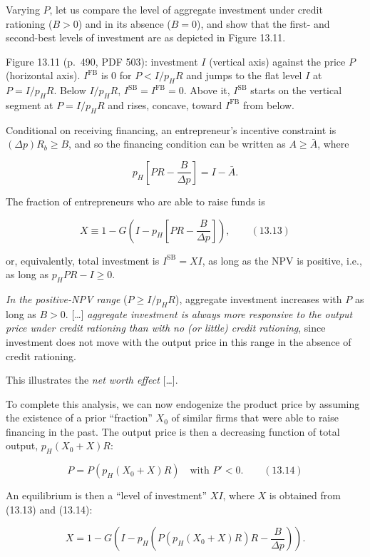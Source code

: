 \documentclass[11pt,a4paper]{article}
\begin{document}
Varying \(P\), let us compare the level of aggregate investment under credit rationing (\(B > 0\))
and in its absence (\(B = 0\)), and show that the first- and second-best levels of investment are as
depicted in Figure 13.11.

Figure 13.11 (p.~490, PDF 503): investment \(I\) (vertical axis) against the price \(P\) (horizontal
axis). \(I^{\text{FB}}\) is 0 for \(P < I/p_H R\) and jumps to the flat level \(I\) at
\(P = I/p_H R\). Below \(I/p_H R\), \(I^{\text{SB}} = I^{\text{FB}} = 0\). Above it,
\(I^{\text{SB}}\) starts on the vertical segment at \(P = I/p_H R\) and rises, concave, toward
\(I^{\text{FB}}\) from below.

Conditional on receiving financing, an entrepreneur's incentive constraint is
\((\Delta p)R_b \geqslant B\), and so the financing condition can be written as
\(A \geqslant \bar A\), where

\[p_H\left[PR - \frac{B}{\Delta p}\right] = I - \bar A.\]

The fraction of entrepreneurs who are able to raise funds is

\[X \equiv 1 - G\left(I - p_H\left[PR - \frac{B}{\Delta p}\right]\right), \qquad (13.13)\]

or, equivalently, total investment is \(I^{\text{SB}} = XI\), as long as the NPV is positive, i.e.,
as long as \(p_H PR - I \geqslant 0\).

\emph{In the positive-NPV range} (\(P \geqslant I/p_H R\)), aggregate investment increases with
\(P\) as long as \(B > 0\). {[}\ldots{]} \emph{aggregate investment is always more responsive to the
output price under credit rationing than with no (or little) credit rationing}, since investment
does not move with the output price in this range in the absence of credit rationing.

This illustrates the \emph{net worth effect} {[}\ldots{]}.

To complete this analysis, we can now endogenize the product price by assuming the existence of a
prior ``fraction'' \(X_0\) of similar firms that were able to raise financing in the past. The
output price is then a decreasing function of total output, \(p_H(X_0 + X)R\):

\[P = P(p_H(X_0 + X)R) \quad\text{with } P' < 0. \qquad (13.14)\]

An equilibrium is then a ``level of investment'' \(XI\), where \(X\) is obtained from (13.13) and
(13.14):

\[X = 1 - G\left(I - p_H\left(P(p_H(X_0 + X)R)R - \frac{B}{\Delta p}\right)\right).\]
\end{document}
